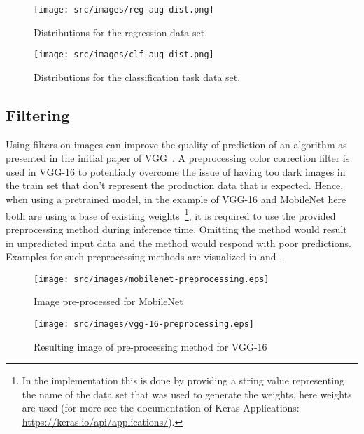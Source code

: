 \begin{figure}
    \centering
    \begin{minipage}{.45\textwidth}
        \texttt{[image: src/images/reg-aug-dist.png]}
        \caption{Distributions for the regression data set.}
        \label{fig:augmentation-distribution}
    \end{minipage}
    \hfill
    \begin{minipage}{.45\textwidth}
    \texttt{[image: src/images/clf-aug-dist.png]}
        \caption{Distributions for the classification task data set.}
        \label{fig:clf-augmentation-distribution}
    \end{minipage}
\end{figure}

\subsection{Filtering}\label{subsec:filtering}
Using filters on images can improve the quality of prediction of an algorithm as presented in the initial paper of VGG~\cite{VGG16}.
A preprocessing color correction filter is used in VGG-16 to potentially overcome the issue of having too dark images in the train set that don't represent the production data that is expected.
Hence, when using a pretrained model, in the example of VGG-16 and MobileNet here both are using a base of existing weights~\footnote{
    In the implementation this is done by providing a string value representing the name of the data set that was used to generate the weights, here  weights are used (for more see the documentation of Keras-Applications: \url{https://keras.io/api/applications/}).
}, it is required to use the provided preprocessing method during inference time.
Omitting the method would result in unpredicted input data and the method would respond with poor predictions.
Examples for such preprocessing methods are visualized in  and .

\begin{figure}[!ht]
    \begin{minipage}{0.45\textwidth}
        \texttt{[image: src/images/mobilenet-preprocessing.eps]}
        \caption{Image pre-processed for MobileNet}
        \label{fig:mobilenet-preprocessing}
    \end{minipage}
    \hfill
    \begin{minipage}{0.45\textwidth}
        \texttt{[image: src/images/vgg-16-preprocessing.eps]}
        \caption{Resulting image of pre-processing method for VGG-16}
        \label{fig:vgg-16-preprocessing}
    \end{minipage}
\end{figure}

